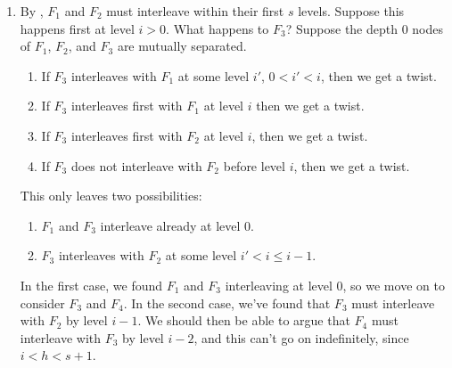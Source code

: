 \documentclass[kpfonts]{patmorin}
\begin{document}
\begin{enumerate}
  \item By , $F_1$ and $F_2$ must interleave within their first $s$ levels. Suppose this happens first at level $i>0$.  What happens to $F_3$?  Suppose the depth 0 nodes of $F_1$, $F_2$, and $F_3$ are mutually separated.
  \begin{enumerate}
    \item If $F_3$ interleaves with $F_1$ at some level $i'$, $0<i'<i$, then we get a twist.
    \item If $F_3$ interleaves first with $F_1$ at level $i$ then we get a twist.
    \item If $F_3$ interleaves first with $F_2$ at level $i$, then we get a twist.
    \item If $F_3$ does not interleave with $F_2$ before level $i$, then we get a twist.
  \end{enumerate}
  This only leaves two possibilities:
  \begin{enumerate}
    \item $F_1$ and $F_3$ interleave already at level 0.
    \item $F_3$ interleaves with $F_2$ at some level $i'<i\le i-1$.
  \end{enumerate}
  In the first case, we found $F_1$ and $F_3$ interleaving at level 0, so we move on to consider $F_3$ and $F_4$.  In the second case, we've found that $F_3$ must interleave with $F_2$ by level $i-1$.  We should then be able to argue that $F_4$ must interleave with $F_3$ by level $i-2$, and this can't go on indefinitely, since $i<h<s+1$.  
\end{enumerate}  
\end{document}
